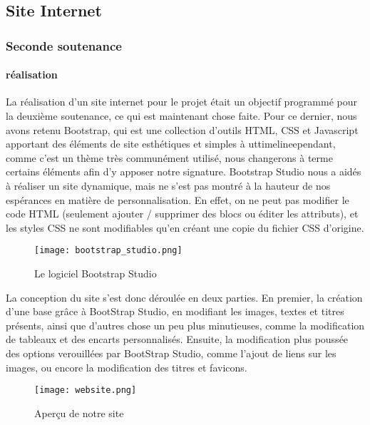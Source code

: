 \subsection{Site Internet}

    \subsubsection{Seconde soutenance}

        \paragraph{réalisation}

        La réalisation d'un site internet pour le projet était un objectif
        programmé pour la deuxième soutenance, ce qui est maintenant chose faite.
        Pour ce dernier, nous avons retenu Bootstrap, qui est une collection
        d'outils HTML, CSS et Javascript apportant des éléments de site
        esthétiques et simples à uttimelineependant, comme c'est un thème très 
        communément utilisé, nous changerons à terme certains éléments afin 
        d'y apposer notre signature. Bootstrap Studio nous a aidés à réaliser
        un site dynamique, mais ne s'est pas montré à la hauteur de nos espérances
        en matière de personnalisation. En effet, on ne peut pas modifier
        le code HTML (seulement ajouter / supprimer des blocs ou éditer les
        attributs), et les styles CSS ne sont modifiables qu'en créant une copie
        du fichier CSS d'origine.

        \begin{figure}[hbt!]
            \centering
            \texttt{[image: bootstrap\_studio.png]}
            \caption{Le logiciel Bootstrap Studio}
        \end{figure}

        La conception du site s'est donc déroulée en deux parties. En premier, la création
        d'une base grâce à BootStrap Studio, en modifiant les images, textes et titres présents, ainsi
        que d'autres chose un peu plus minutieuses, comme la modification de tableaux et des encarts personnalisés.
        Ensuite, la modification plus poussée des options verouillées par BootStrap Studio, comme l'ajout de liens 
        sur les images, ou encore la modification des titres et favicons.

        \begin{figure}[hbt!]
            \centering
            \texttt{[image: website.png]}
            \caption{Aperçu de notre site}
        \end{figure}
        \FloatBarrier


